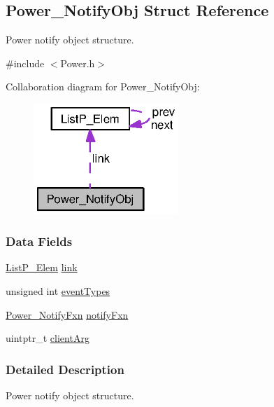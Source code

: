\subsection{Power\+\_\+\+Notify\+Obj Struct Reference}
\label{struct_power___notify_obj}


Power notify object structure.  




{\ttfamily \#include $<$Power.\+h$>$}



Collaboration diagram for Power\+\_\+\+Notify\+Obj\+:
\nopagebreak
\begin{figure}[H]
\begin{center}
\leavevmode
\includegraphics[width=155pt]{struct_power___notify_obj__coll__graph}
\end{center}
\end{figure}
\subsubsection*{Data Fields}
\begin{DoxyCompactItemize}
\item 
\hyperlink{struct_list_p___elem}{List\+P\+\_\+\+Elem} \hyperlink{struct_power___notify_obj_ac29b08d6a225b7bdebc98adc931e3276}{link}
\item 
unsigned int \hyperlink{struct_power___notify_obj_a9ca54b240450f2575f6f70e578c8b988}{event\+Types}
\item 
\hyperlink{_power_8h_a91335240b2081eeefec80d043030c857}{Power\+\_\+\+Notify\+Fxn} \hyperlink{struct_power___notify_obj_acfc434bbe72476fdac364ffe7df28f4c}{notify\+Fxn}
\item 
uintptr\+\_\+t \hyperlink{struct_power___notify_obj_ab430e61fc76f545d992c452a3bc74405}{client\+Arg}
\end{DoxyCompactItemize}


\subsubsection{Detailed Description}
Power notify object structure. 

